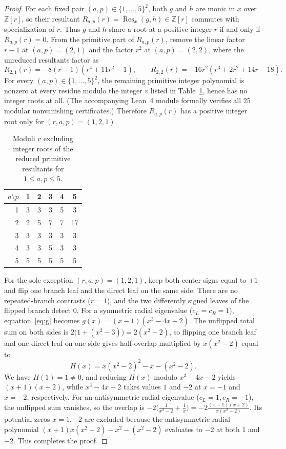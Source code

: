 \documentclass[11pt]{article}
\theoremstyle{plain}
\theoremstyle{remark}
\DeclareMathOperator{\Res}{Res}
\begin{document}
\begin{proof}
For each fixed pair $(a,p) \in \{1,\dots,5\}^2$, both $g$ and $h$ are monic in
$x$ over $\mathbb{Z}[r]$, so their resultant
$R_{a,p}(r) = \Res_x(g,h) \in \mathbb{Z}[r]$ commutes with specialization of
$r$. Thus $g$ and $h$ share a root at a positive integer $r$ if and only if
$R_{a,p}(r) = 0$. From the primitive part of $R_{a,p}(r)$, remove the linear
factor $r - 1$ at $(a,p) = (2,1)$ and the factor $r^2$ at $(a,p) = (2,2)$,
where the unreduced resultants factor as
\[
  R_{2,1}(r) = -8(r - 1)(r^4 + 11r^2 - 1), \qquad
  R_{2,2}(r) = -16 r^2(r^3 + 2r^2 + 14r - 18).
\]
For every $(a,p) \in \{1,\dots,5\}^2$, the remaining primitive integer
polynomial is nonzero at every residue modulo the integer $v$ listed in
Table~\ref{tab:mod-certs}, hence has no integer roots at all. (The accompanying
Lean~4 module  formally verifies
all $25$ modular nonvanishing certificates.) Therefore $R_{a,p}(r)$ has a
positive integer root only for $(r,a,p) = (1,2,1)$.

\begin{table}[ht]
\centering
\caption{Moduli $v$ excluding integer roots of the reduced primitive resultants for $1 \leq a,p \leq 5$.}\label{tab:mod-certs}
\begin{tabular}{rccccc}
\toprule
$a \setminus p$ & 1 & 2 & 3 & 4 & 5 \\
\midrule
1 & 3 & 3 & 3 & 5 & 3 \\
2 & 2 & 5 & 7 & 7 & 17 \\
3 & 3 & 3 & 3 & 3 & 3 \\
4 & 3 & 3 & 5 & 3 & 3 \\
5 & 5 & 5 & 5 & 5 & 5 \\
\bottomrule
\end{tabular}
\end{table}

For the sole exception $(r,a,p) = (1,2,1)$, keep both center signs equal to
$+1$ and flip one branch leaf and the direct leaf on the same side. There are
no repeated-branch contrasts ($r=1$), and the two differently signed leaves of
the flipped branch detect $0$. For a symmetric radial eigenvalue ($c_L=c_R=1$),
equation~\eqref{eq:g} becomes $g(x) = (x-1)(x^3 - 4x - 2)$. The unflipped total
sum on both sides is $2\bigl(1 + (x^2 - 3)\bigr) = 2(x^2 - 2)$, so flipping one
branch leaf and one direct leaf on one side gives half-overlap multiplied by
$x(x^2-2)$ equal to
\[
  H(x) = x(x^2 - 2)^2 - x - (x^2 - 2).
\]
We have $H(1) = 1 \neq 0$, and reducing $H(x)$ modulo $x^3 - 4x - 2$ yields
$(x+1)(x+2)$, while $x^3 - 4x - 2$ takes values $1$ and $-2$ at $x = -1$ and
$x = -2$, respectively. For an antisymmetric radial eigenvalue
($c_L = 1, c_R = -1$), the unflipped sum vanishes, so the overlap is
$-2\bigl(\frac{1}{x^2-2} + \frac{1}{x}\bigr) = -2\frac{(x-1)(x+2)}{x(x^2-2)}$.
Its potential zeros $x = 1, -2$ are excluded because the antisymmetric radial
polynomial $(x+1)x(x^2-2) - x^2 - (x^2-2)$ evaluates to $-2$ at both $1$ and
$-2$. This completes the proof.
\end{proof}
\end{document}
